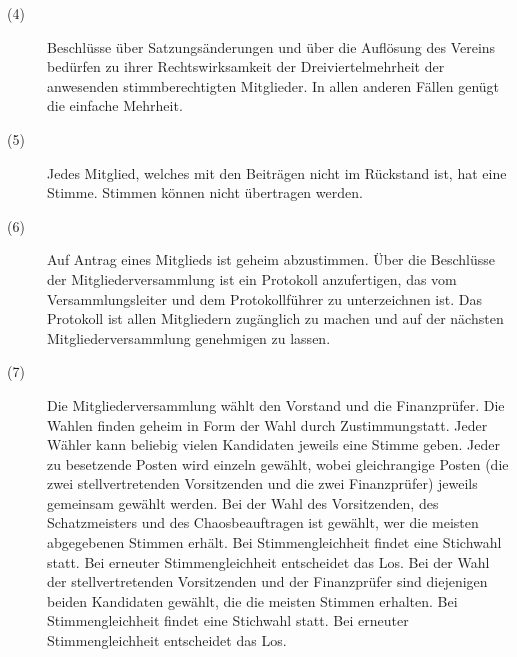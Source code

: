 \documentclass[12pt,paper=a4,ngerman]{scrreprt}
\begin{document}
\begin{description}
\item[(4)] Beschlüsse über Satzungsänderungen und über die Auflösung des Vereins bedürfen zu ihrer Rechtswirksamkeit der Dreiviertelmehrheit der anwesenden stimmberechtigten Mitglieder. In allen anderen Fällen genügt die einfache Mehrheit.
\item[(5)] Jedes Mitglied, welches mit den Beiträgen nicht im Rückstand ist, hat eine Stimme. Stimmen können nicht übertragen werden.
\item[(6)] Auf Antrag eines Mitglieds ist geheim abzustimmen. Über die Beschlüsse der Mitgliederversammlung ist ein Protokoll anzufertigen, das vom Versammlungsleiter und dem Protokollführer zu unterzeichnen ist. Das Protokoll ist allen Mitgliedern zugänglich zu machen und auf der nächsten Mitgliederversammlung genehmigen zu lassen.
\item[(7)] Die Mitgliederversammlung wählt den Vorstand und die Finanzprüfer. Die Wahlen finden geheim in Form der \grqq Wahl durch Zustimmung\grqq statt. Jeder Wähler kann beliebig vielen Kandidaten jeweils eine Stimme geben. Jeder zu besetzende Posten wird einzeln gewählt, wobei gleichrangige Posten (die zwei stellvertretenden Vorsitzenden und die zwei Finanzprüfer) jeweils gemeinsam gewählt werden. Bei der Wahl des Vorsitzenden, des Schatzmeisters und des Chaosbeauftragen ist gewählt, wer die meisten abgegebenen Stimmen erhält. Bei Stimmengleichheit findet eine Stichwahl statt. Bei erneuter Stimmengleichheit entscheidet das Los. Bei der Wahl der stellvertretenden Vorsitzenden und der Finanzprüfer sind diejenigen beiden Kandidaten gewählt, die die meisten Stimmen erhalten. Bei Stimmengleichheit findet eine Stichwahl statt. Bei erneuter Stimmengleichheit entscheidet das Los.
\end{description}
\end{document}
